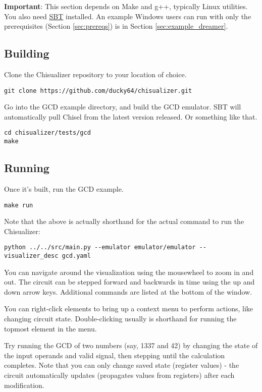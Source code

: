 \documentclass[11pt]{article}
\begin{document}
\textbf{Important}: This section depends on Make and g++, typically Linux utilities. You also need \href{http://www.scala-sbt.org/}{SBT} installed. An example Windows users can run with only the prerequisites (Section \ref{sec:prereqs}) is in Section \ref{sec:example_dreamer}.

\subsection{Building}
Clone the Chisualizer repository to your location of choice.
\begin{verbatim}
git clone https://github.com/ducky64/chisualizer.git
\end{verbatim}

Go into the GCD example directory, and build the GCD emulator. SBT will automatically pull Chisel from the latest version released. Or something like that.
\begin{verbatim}
cd chisualizer/tests/gcd
make
\end{verbatim}

\subsection{Running}
Once it's built, run the GCD example.
\begin{verbatim}
make run
\end{verbatim}

Note that the above is actually shorthand for the actual command to run the Chisualizer:
\begin{verbatim}
python ../../src/main.py --emulator emulator/emulator --visualizer_desc gcd.yaml
\end{verbatim}

You can navigate around the visualization using the mousewheel to zoom in and out. The circuit can be stepped forward and backwards in time using the up and down arrow keys. Additional commands are listed at the bottom of the window.

You can right-click elements to bring up a context menu to perform actions, like changing circuit state. Double-clicking usually is shorthand for running the topmost element in the menu.

Try running the GCD of two numbers (say, 1337 and 42) by changing the state of the input operands and valid signal, then stepping until the calculation completes. Note that you can only change saved state (register values) - the circuit automatically updates (propagates values from registers) after each modification.
\end{document}
